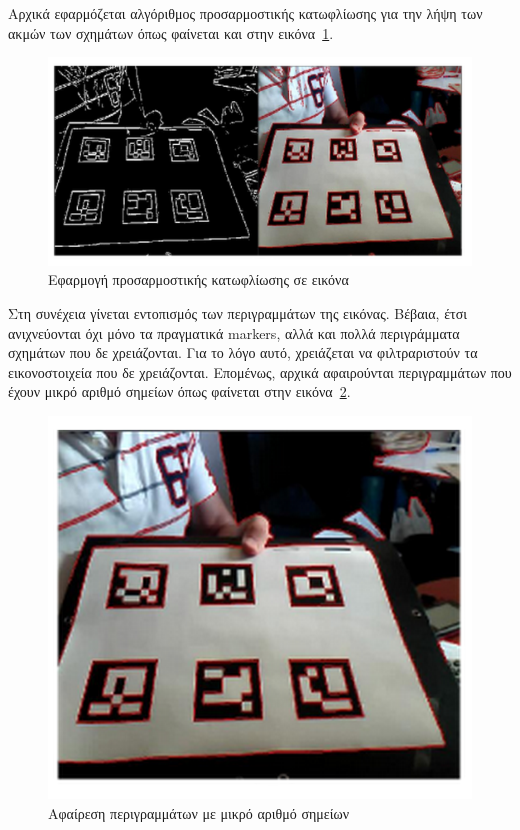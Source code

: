 Αρχικά εφαρμόζεται αλγόριθμος προσαρμοστικής κατωφλίωσης για την λήψη των ακμών των σχημάτων όπως φαίνεται και στην εικόνα~\ref{fig:aruco1}.

\begin{figure}[H]
    \centering
    \includegraphics[scale=0.5, angle=0]{Files/Figures/aruco1.png}
    \caption[Εφαρμογή προσαρμοστικής κατωφλίωσης σε εικόνα]{Εφαρμογή προσαρμοστικής κατωφλίωσης σε εικόνα}
    \label{fig:aruco1}
\end{figure}


Στη συνέχεια γίνεται εντοπισμός των περιγραμμάτων της εικόνας. Βέβαια, έτσι ανιχνεύονται όχι μόνο τα πραγματικά markers, αλλά και πολλά περιγράμματα σχημάτων που δε χρειάζονται. Για το λόγο αυτό, χρειάζεται να φιλτραριστούν τα εικονοστοιχεία που δε χρειάζονται. Επομένως, αρχικά αφαιρούνται περιγραμμάτων που έχουν μικρό αριθμό σημείων όπως φαίνεται στην εικόνα~\ref{fig:aruco2}.


\begin{figure}[H]
    \centering
    \includegraphics[scale=0.53, angle=0]{Files/Figures/aruco2.png}
    \caption[Αφαίρεση περιγραμμάτων με μικρό αριθμό σημείων]{Αφαίρεση περιγραμμάτων με μικρό αριθμό σημείων}
    \label{fig:aruco2}
\end{figure}



